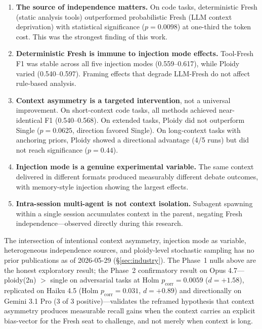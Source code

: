 \documentclass[11pt]{article}
\begin{document}
\begin{enumerate}[label=\arabic*., leftmargin=1.5em]
  \item \textbf{The source of independence matters.} On code tasks, deterministic Fresh (static analysis tools) outperformed probabilistic Fresh (LLM context deprivation) with statistical significance ($p{=}0.0098$) at one-third the token cost. This was the strongest finding of this work.
  \item \textbf{Deterministic Fresh is immune to injection mode effects.} Tool-Fresh F1 was stable across all five injection modes (0.559--0.617), while Ploidy varied (0.540--0.597). Framing effects that degrade LLM-Fresh do not affect rule-based analysis.
  \item \textbf{Context asymmetry is a targeted intervention}, not a universal improvement. On short-context code tasks, all methods achieved near-identical F1 (0.540--0.568). On extended tasks, Ploidy did not outperform Single ($p{=}0.0625$, direction favored Single). On long-context tasks with anchoring priors, Ploidy showed a directional advantage (4/5 runs) but did not reach significance ($p{=}0.44$).
  \item \textbf{Injection mode is a genuine experimental variable.} The same context delivered in different formats produced measurably different debate outcomes, with memory-style injection showing the largest effects.
  \item \textbf{Intra-session multi-agent is not context isolation.} Subagent spawning within a single session accumulates context in the parent, negating Fresh independence---observed directly during this research.
\end{enumerate}

The intersection of intentional context asymmetry, injection mode as variable, heterogeneous independence sources, and ploidy-level stochastic sampling has no prior publications as of 2026-05-29 (\S\ref{sec:industry}). The Phase~1 nulls above are the honest exploratory result; the Phase~2 confirmatory result on Opus 4.7---ploidy(2n) $>$ single on adversarial tasks at Holm $p_\text{corr} = 0.0059$ ($d = +1.58$), replicated on Haiku 4.5 (Holm $p_\text{corr} = 0.031$, $d = +0.89$) and directionally on Gemini 3.1 Pro (3 of 3 positive)---validates the reframed hypothesis that context asymmetry produces measurable recall gains when the context carries an explicit bias-vector for the Fresh seat to challenge, and not merely when context is long.
\end{document}
